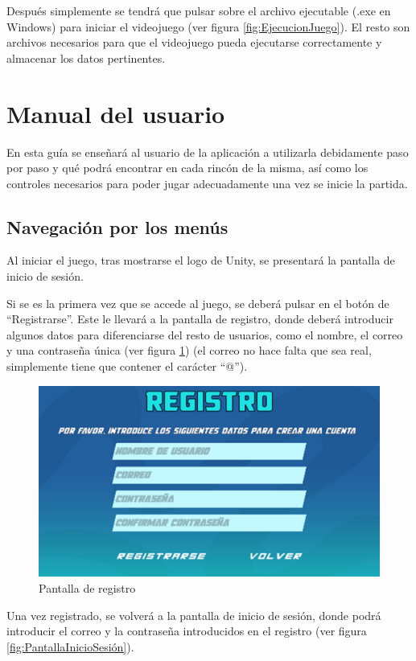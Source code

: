 Después simplemente se tendrá que pulsar sobre el archivo ejecutable (.exe en Windows) para iniciar el videojuego (ver figura \ref{fig:EjecucionJuego}). El resto son archivos necesarios para que el videojuego pueda ejecutarse correctamente y almacenar los datos pertinentes.

\section{Manual del usuario}
En esta guía se enseñará al usuario de la aplicación a utilizarla debidamente paso por paso y qué podrá encontrar en cada rincón de la misma, así como los controles necesarios para poder jugar adecuadamente una vez se inicie la partida.

\subsection{Navegación por los menús}
Al iniciar el juego, tras mostrarse el logo de Unity, se presentará la pantalla de inicio de sesión.

Si se es la primera vez que se accede al juego, se deberá pulsar en el botón de ``Registrarse''. Este le llevará a la pantalla de registro, donde deberá introducir algunos datos para diferenciarse del resto de usuarios, como el nombre, el correo y una contraseña única (ver figura \ref{fig:PantallaRegistro}) (el correo no hace falta que sea real, simplemente tiene que contener el carácter ``@'').

\begin{figure}[h]
    \centering
    \includegraphics[scale=0.45]{img/SignUpScreen.jpg}
    \caption{Pantalla de registro}
    \label{fig:PantallaRegistro}
    \end{figure}
    
Una vez registrado, se volverá a la pantalla de inicio de sesión, donde podrá introducir el correo y la contraseña introducidos en el registro (ver figura \ref{fig:PantallaInicioSesión}).

